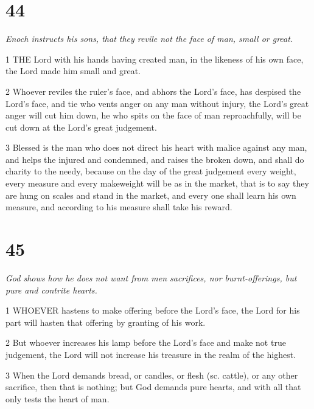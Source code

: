 \chapter{44}

\par \textit{Enoch instructs his sons, that they revile not the face of man, small or great.}

\par 1 THE Lord with his hands having created man, in the likeness of his own face, the Lord made him small and great.

\par 2 Whoever reviles the ruler's face, and abhors the Lord's face, has despised the Lord's face, and tie who vents anger on any man without injury, the Lord's great anger will cut him down, he who spits on the face of man reproachfully, will be cut down at the Lord's great judgement.

\par 3 Blessed is the man who does not direct his heart with malice against any man, and helps the injured and condemned, and raises the broken down, and shall do charity to the needy, because on the day of the great judgement every weight, every measure and every makeweight will be as in the market, that is to say they are hung on scales and stand in the market, and every one shall learn his own measure, and according to his measure shall take his reward.



\chapter{45}

\par \textit{God shows how he does not want from men sacrifices, nor burnt-offerings, but pure and contrite hearts.}

\par 1 WHOEVER hastens to make offering before the Lord's face, the Lord for his part will hasten that offering by granting of his work.

\par 2 But whoever increases his lamp before the Lord's face and make not true judgement, the Lord will not increase his treasure in the realm of the highest.

\par 3 When the Lord demands bread, or candles, or flesh (sc. cattle), or any other sacrifice, then that is nothing; but God demands pure hearts, and with all that only tests the heart of man.

